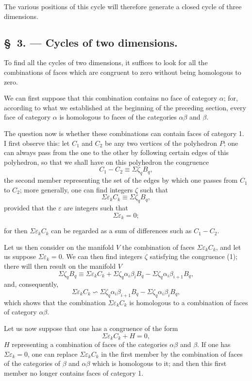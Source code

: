 \documentclass{article}
\begin{document}
The various positions of this cycle will therefore generate a closed cycle of three dimensions.

\subsection*{\S~3. --- Cycles of two dimensions.}

To find all the cycles of two dimensions, it suffices to look for all the combinations of faces which are congruent to zero without being homologous to zero.

We can first suppose that this combination contains no face of category $\alpha$; for, according to what we established at the beginning of the preceding section, every face of category $\alpha$ is homologous to faces of the categories $\alpha\beta$ and $\beta$.

The question now is whether these combinations can contain faces of category 1. I first observe this: let $C_{1}$ and $C_{2}$ be any two vertices of the polyhedron $P$; one can always pass from the one to the other by following certain edges of this polyhedron, so that we shall have on this polyhedron the congruence
\[ C_{1} - C_{2} \equiv \Sigma \zeta_{q} B_{q}, \]
the second member representing the set of the edges by which one passes from $C_{1}$ to $C_{2}$; more generally, one can find integers $\zeta$ such that
\[ \Sigma \varepsilon_{k} C_{k} \equiv \Sigma \zeta_{q} B_{q}, \tag{1} \]
provided that the $\varepsilon$ are integers such that
\[ \Sigma \varepsilon_{k} = 0; \]

for then $\Sigma \varepsilon_{k} C_{k}$ can be regarded as a sum of differences such as $C_{1} - C_{2}$.

Let us then consider on the manifold $V$ the combination of faces $\Sigma \varepsilon_{k} C_{k}$, and let us suppose $\Sigma \varepsilon_{k} = 0$. We can then find integers $\zeta$ satisfying the congruence (1); there will then result on the manifold $V$
\[ \Sigma \zeta_{q} B_{q} \equiv \Sigma \varepsilon_{k} C_{k} + \Sigma \zeta_{q} \alpha_{i}\beta_{i}B_{q} - \Sigma \zeta_{q} \alpha_{i}\beta_{i+1}B_{q}, \]
and, consequently,
\[ \Sigma \varepsilon_{k} C_{k} \backsim \Sigma \zeta_{q} \alpha_{i}\beta_{i+1}B_{q} - \Sigma \zeta_{q} \alpha_{i}\beta_{i}B_{q}, \]
which shows that the combination $\Sigma \varepsilon_{k} C_{k}$ is homologous to a combination of faces of category $\alpha\beta$.

Let us now suppose that one has a congruence of the form
\[ \Sigma \varepsilon_{k} C_{k} + H = 0, \]
$H$ representing a combination of faces of the categories $\alpha\beta$ and $\beta$. If one has $\Sigma \varepsilon_{k} = 0$, one can replace $\Sigma \varepsilon_{k} C_{k}$ in the first member by the combination of faces of the categories of $\beta$ and $\alpha\beta$ which is homologous to it; and then this first member no longer contains faces of category 1.
\end{document}

